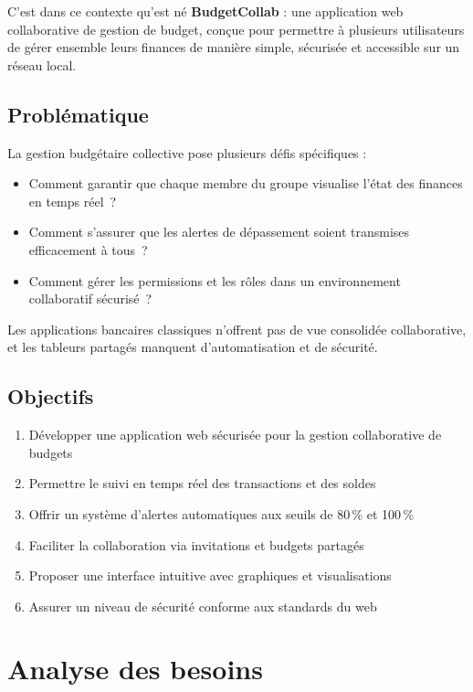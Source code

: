 \documentclass[12pt,a4paper,twoside]{report}
\begin{document}
C'est dans ce contexte qu'est né \textbf{BudgetCollab} : une application web collaborative de gestion de budget, conçue pour permettre à plusieurs utilisateurs de gérer ensemble leurs finances de manière simple, sécurisée et accessible sur un réseau local.

\section{Problématique}

La gestion budgétaire collective pose plusieurs défis spécifiques :
\begin{itemize}
  \item Comment garantir que chaque membre du groupe visualise l'état des finances en temps réel~?
  \item Comment s'assurer que les alertes de dépassement soient transmises efficacement à tous~?
  \item Comment gérer les permissions et les rôles dans un environnement collaboratif sécurisé~?
\end{itemize}

Les applications bancaires classiques n'offrent pas de vue consolidée collaborative, et les tableurs partagés manquent d'automatisation et de sécurité.

\section{Objectifs}

\begin{enumerate}
  \item Développer une application web sécurisée pour la gestion collaborative de budgets
  \item Permettre le suivi en temps réel des transactions et des soldes
  \item Offrir un système d'alertes automatiques aux seuils de 80\,\% et 100\,\%
  \item Faciliter la collaboration via invitations et budgets partagés
  \item Proposer une interface intuitive avec graphiques et visualisations
  \item Assurer un niveau de sécurité conforme aux standards du web
\end{enumerate}

\chapter{Analyse des besoins}
\end{document}
